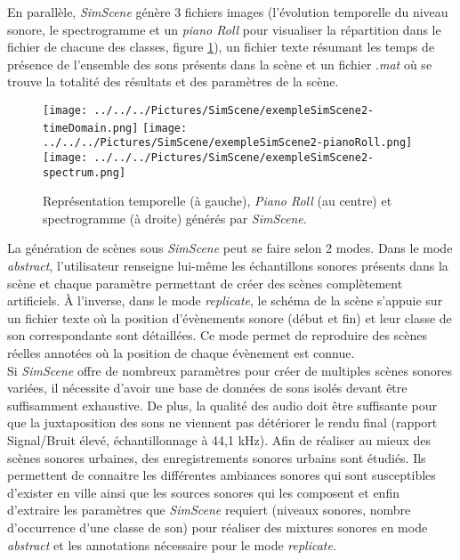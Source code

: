 En parallèle, \textit{SimScene} génère 3 fichiers images (l'évolution temporelle du niveau sonore, le spectrogramme et un \textit{piano Roll} pour visualiser la répartition dans le fichier de chacune des classes, figure \ref{fig:somefiglabel}), un fichier texte résumant les temps de présence de l'ensemble des sons présents dans la scène et un fichier .\textit{mat} où se trouve la totalité des résultats et des paramètres de la scène.\\


\begin{figure}[ht]
\texttt{[image: ../../../Pictures/SimScene/exempleSimScene2-timeDomain.png]}\hfill
\texttt{[image: ../../../Pictures/SimScene/exempleSimScene2-pianoRoll.png]}\hfill
\texttt{[image: ../../../Pictures/SimScene/exempleSimScene2-spectrum.png]}
\caption{Représentation temporelle (à gauche), \textit{Piano Roll} (au centre) et spectrogramme (à droite) générés par \textit{SimScene}.}\label{fig:somefiglabel}
\end{figure}

La génération de scènes sous \textit{SimScene} peut se faire selon 2 modes. Dans le mode \textit{abstract}, l'utilisateur renseigne lui-même les échantillons sonores présents dans la scène et chaque paramètre permettant de créer des scènes complètement artificiels. \`A l'inverse, dans le mode \textit{replicate}, le schéma de la scène s'appuie sur un fichier texte où la position d'évènements sonore (début et fin) et leur classe de son correspondante sont détaillées. Ce mode permet de reproduire des scènes réelles annotées où la position de chaque évènement est connue.\\

Si \textit{SimScene} offre de nombreux paramètres pour créer de multiples scènes sonores variées, il nécessite d'avoir une base de données de sons isolés devant être suffisamment exhaustive. De plus, la qualité des audio doit être suffisante pour que la juxtaposition des sons ne viennent pas détériorer le rendu final (rapport Signal/Bruit élevé, échantillonnage à 44,1 kHz). Afin de réaliser au mieux des scènes sonores urbaines, des enregistrements sonores urbains sont étudiés. Ils permettent de connaitre les différentes ambiances sonores qui sont susceptibles d'exister en ville ainsi que les sources sonores qui les composent et enfin d'extraire les paramètres que \textit{SimScene} requiert (niveaux sonores, nombre d'occurrence d'une classe de son) pour réaliser des mixtures sonores en mode \textit{abstract} et les annotations nécessaire pour le mode \textit{replicate}. \\

